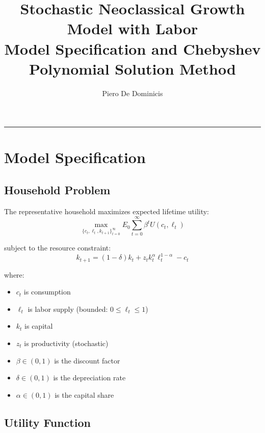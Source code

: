 \documentclass[11pt]{article}
\title{\textbf{Stochastic Neoclassical Growth Model with Labor}\\
\large Model Specification and Chebyshev Polynomial Solution Method}
\author{Piero De Dominicis}
\date{\vspace{-0.5cm}}
\theoremstyle{definition}
\begin{document}
\maketitle
\thispagestyle{empty}

\vspace{-0.5cm}
\begin{center}
\rule{0.8\textwidth}{0.4pt}
\end{center}
\vspace{0.3cm}

\section{Model Specification}

\vspace{0.2cm}
\subsection{Household Problem}

The representative household maximizes expected lifetime utility:
\begin{equation}
\max_{\{c_t, \ell_t, k_{t+1}\}_{t=0}^{\infty}} E_0 \sum_{t=0}^{\infty} \beta^t U(c_t, \ell_t)
\end{equation}

subject to the resource constraint:
\begin{equation}
k_{t+1} = (1-\delta) k_t + z_t k_t^{\alpha} \ell_t^{1-\alpha} - c_t
\end{equation}

where:
\begin{itemize}[leftmargin=*, itemsep=0.1em]
\item $c_t$ is consumption
\item $\ell_t$ is labor supply (bounded: $0 \leq \ell_t \leq 1$)
\item $k_t$ is capital
\item $z_t$ is productivity (stochastic)
\item $\beta \in (0,1)$ is the discount factor
\item $\delta \in (0,1)$ is the depreciation rate
\item $\alpha \in (0,1)$ is the capital share
\end{itemize}

\subsection{Utility Function}
\end{document}
